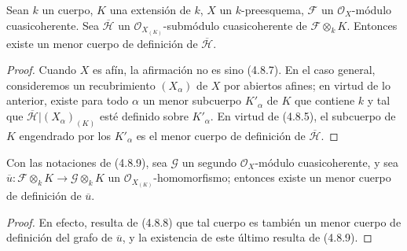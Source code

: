 \begin{proposition}[4.8.9]
\label{IV.2.4.8.9-fr}
Sean $k$ un cuerpo, $K$ una extensión de $k$, $X$ un $k$-preesquema,
$\mathscr F$ un $\mathcal O_X$-módulo cuasicoherente. Sea $\overline{\mathscr H}$ un
$\mathcal O_{X_{(K)}}$-submódulo cuasicoherente de
$\mathscr F\otimes_kK$. Entonces existe un menor cuerpo de definición de
$\overline{\mathscr H}$.
\end{proposition}

\begin{proof}
Cuando $X$ es afín, la afirmación no es sino (4.8.7). En el caso general,
consideremos un recubrimiento $(X_\alpha)$ de $X$ por abiertos afines; en
virtud de lo anterior, existe para todo $\alpha$ un menor subcuerpo $K'_\alpha$
de $K$ que contiene $k$ y tal que
$\overline{\mathscr H}|(X_\alpha)_{(K)}$ esté definido sobre $K'_\alpha$. En virtud de
(4.8.5), el subcuerpo de $K$ engendrado por los $K'_\alpha$ es el menor
cuerpo de definición de $\overline{\mathscr H}$.
\end{proof}

\begin{corollary}[4.8.10]
\label{IV.2.4.8.10-fr}
Con las notaciones de \textup{(4.8.9)}, sea $\mathscr G$ un segundo
$\mathcal O_X$-módulo cuasicoherente, y sea
$\overline u:\mathscr F\otimes_kK\to\mathscr G\otimes_kK$ un
$\mathcal O_{X_{(K)}}$-homomorfismo; entonces existe un menor cuerpo de
definición de $\overline u$.
\end{corollary}


\begin{proof}
En efecto, resulta de (4.8.8) que tal cuerpo es también un menor cuerpo de
definición del grafo de $\overline u$, y la existencia de este último resulta
de (4.8.9).
\end{proof}
